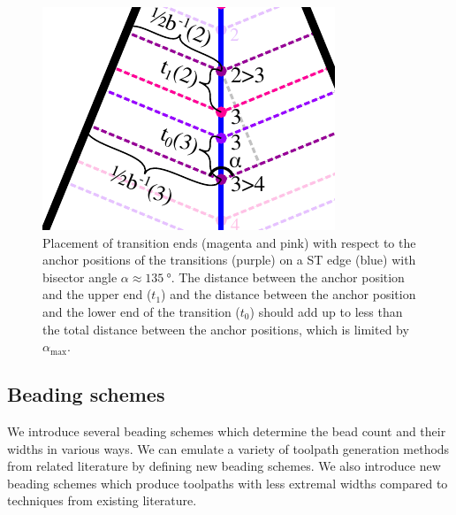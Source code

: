 \begin{figure}
\centering
\includegraphics[width=.4\columnwidth,frame]{sources-method-transition-length-limit.pdf}
\caption{
Placement of transition ends (magenta and pink) with respect to the anchor positions of the transitions (purple) on a ST edge (blue) with bisector angle $\alpha \approx \SI{135}{\degree}$.
The distance between the anchor position and the upper end ($t_1$) and the distance between the anchor position and the lower end of the transition ($t_0$) should add up to less than the total distance between the anchor positions, which is limited by $\alpha_\text{max}$.
}
\label{transition_placement}
\end{figure}





\subsection{Beading schemes}
We introduce several beading schemes which determine the bead count and their widths in various ways.
We can emulate a variety of toolpath generation methods from related literature by defining new beading schemes.
We also introduce new beading schemes which produce toolpaths with less extremal widths compared to techniques from existing literature.

